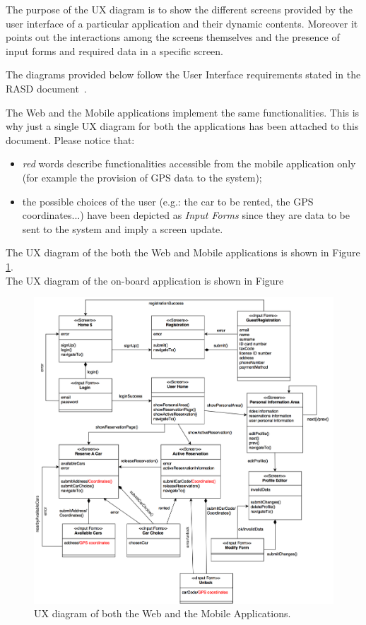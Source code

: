 The purpose of the UX diagram is to show the different screens provided by the user interface of a particular application and their dynamic contents. Moreover it points out the interactions among the screens themselves and the presence of input forms and required data in a specific screen.

The diagrams provided below follow the User Interface requirements stated in the RASD document~\cite{rasd}.

The Web and the Mobile applications implement the same functionalities. This is why just a single UX diagram for both the applications has been attached to this document. Please notice that:
\begin{itemize}
\item \emph{\color{red} red} words describe functionalities accessible from the mobile application only (for example the provision of GPS data to the system);
\item the possible choices of the user (e.g.: the car to be rented, the GPS coordinates...) have been depicted as \emph{Input Forms} since they are data to be sent to the system and imply a screen update.
\end{itemize}
The UX diagram of the both the Web and Mobile applications is shown in Figure \ref{web_mobile_ux}. \\
The UX diagram of the on-board application is shown in Figure %

\begin{figure}[H]
\begin{center}
		\includegraphics[width=\textwidth]{./user_interface_design/diagrams/web_mobile_ux.png}
		\caption{UX diagram of both the Web and the Mobile Applications.}
		\label{web_mobile_ux}
\end{center}
\end{figure}

